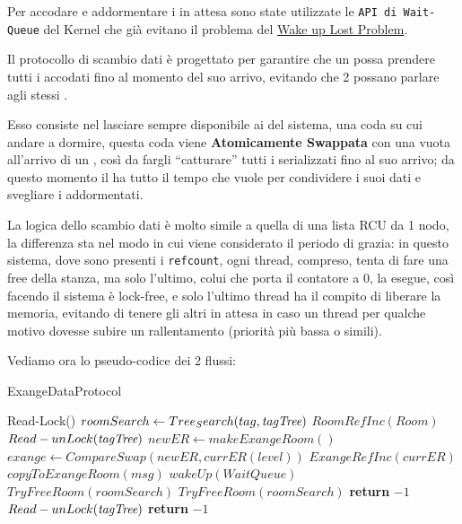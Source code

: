 Per accodare e addormentare i \Reader in attesa sono state utilizzate le  \texttt{API di Wait-Queue} del Kernel che già
evitano il problema del \underline{Wake up Lost Problem}.

Il protocollo di scambio dati è progettato per garantire che un \Writer possa prendere tutti i \Reader accodati fino al
momento del suo arrivo, evitando che 2 \Writer possano parlare agli stessi \Reader.

Esso consiste nel lasciare sempre disponibile ai \Reader del sistema, una coda su cui andare a dormire, questa coda
viene \textbf{Atomicamente Swappata}  con una vuota all'arrivo di un \Writer, così da fargli ``catturare'' tutti i
\Reader serializzati fino al suo arrivo; da questo momento il \Writer ha tutto il tempo che vuole per condividere i
suoi dati e svegliare i \Reader addormentati.

La logica dello scambio dati è molto simile a quella di una lista RCU da 1 nodo, la differenza sta nel modo in cui
viene considerato il periodo di grazia: in questo sistema, dove sono presenti i \texttt{refcount}, ogni thread, \Writer
compreso, tenta di fare una free della stanza, ma solo l'ultimo, colui che porta il contatore a 0, la esegue, così
facendo il sistema è lock-free, e solo l'ultimo thread ha il compito di liberare la memoria, evitando di tenere gli
altri in attesa in caso un thread per qualche motivo dovesse subire un rallentamento (priorità più bassa o simili).


Vediamo ora lo pseudo-codice dei 2 flussi:

\begin{algorithm}
\caption{\Writer ExangeDataProtocol}\label{writeExange}
\begin{algorithmic}[1]
\State Read-Lock(\tagTree)
\State $roomSearch \gets Tree_Search(tag, \textit{tagTree})$
    \State $RoomRefInc(Room)$
    \State $Read-unLock(\textit{tagTree})$
        \State $newER \gets makeExangeRoom()$
        {
        \color{red}
        \State $exange \gets CompareSwap(newER, currER(level))$
        \State $ExangeRefInc(currER)$
        }
        \State $copyToExangeRoom(msg)$
        \State $wakeUp(WaitQueue)$
        \State $TryFreeRoom(roomSearch)$
    \Else
        \State $TryFreeRoom(roomSearch)$
        \State \textbf{return} $-1$
    \EndIf
\Else
    \State $Read-unLock(\textit{tagTree})$
    \State \textbf{return} $-1$

\EndIf
\EndProcedure
\end{algorithmic}
\end{algorithm}

